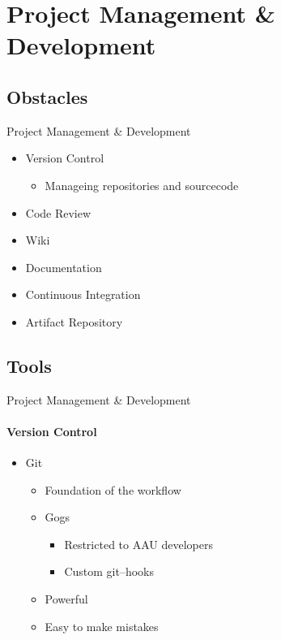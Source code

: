 \section{Project Management \& Development}
\subsection{Obstacles}
\begin{frame}{Project Management \& Development}
    \begin{itemize}
        \item Version Control
        \begin{itemize}
            \item Manageing repositories and sourcecode
        \end{itemize}
        \item Code Review
        \item Wiki
        \item Documentation
        \item Continuous Integration
        \item Artifact Repository
    \end{itemize}
\end{frame}
\subsection{Tools}
\begin{frame}[t]{Project Management \& Development}\framesubtitle{Version Control}
    \begin{itemize}
        \item Git
        \begin{itemize}
            \item Foundation of the workflow
            \item Gogs
            \begin{itemize}
                \item Restricted to AAU developers
                \item Custom git--hooks
            \end{itemize}
            \item Powerful
            \item Easy to make mistakes
        \end{itemize}
    \end{itemize}
\end{frame}

